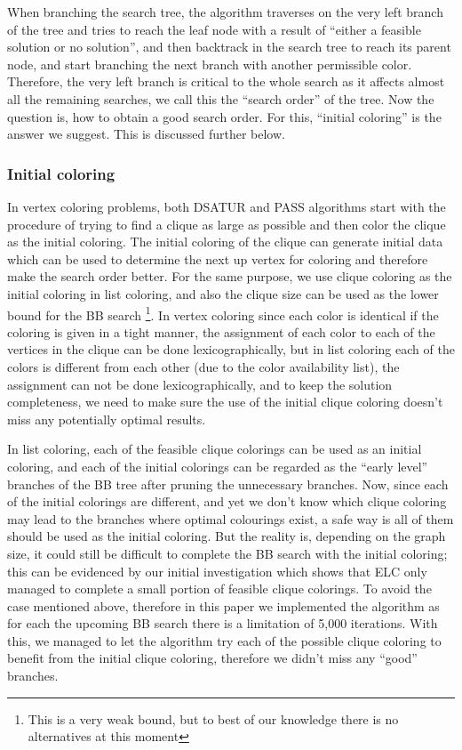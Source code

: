 \documentclass[10pt]{article}
\begin{document}
When branching the search tree, the algorithm traverses on the very left branch of 
the tree and tries to reach the leaf node with a result of ``either a feasible solution or
no solution'', and then backtrack in the search tree to reach its parent node,
and start branching the next branch with another permissible color. Therefore, the very left
branch is critical to the whole search as it affects almost all the remaining searches, we call this the ``search order'' of the tree. Now the question is, how to obtain a good search order. For this, ``initial coloring'' is the answer we suggest. This is discussed further below.   

\subsubsection{Initial coloring}

In vertex coloring problems, both DSATUR\cite{Bre79} and PASS algorithms \cite{PASS} start
with the procedure of trying to find a clique as large as possible and then color the clique as the initial
coloring. The initial coloring of the clique can generate initial data which can be used to determine the next 
up vertex for coloring and therefore make the search order better. For the same purpose, we use clique coloring
as the initial coloring in list coloring, and also the clique size can be used as the lower bound for the BB search \footnote{This is a very weak bound, but to best of our knowledge there is no alternatives at this moment}. In vertex coloring since 
each color is identical if the coloring is given in a tight manner, the assignment of each color 
to each of the vertices in the clique can be done lexicographically, but in list coloring
each of the colors is different from each other (due to the color availability list), the assignment can
not be done lexicographically, and to keep the solution completeness, we need to make sure 
the use of the initial clique coloring doesn't miss any potentially optimal results.  

In list coloring, each of the feasible clique colorings can be used as an initial coloring, and 
each of the initial colorings can be regarded as the ``early level'' branches of the BB tree after pruning the
unnecessary branches. Now, since each of the initial colorings are different, and yet we don't know which 
clique coloring may lead to the branches where optimal colourings exist,   a safe way is all of them should be used as the initial coloring. But the reality is, depending on the graph size, it could still be difficult to complete the BB search with the initial coloring; this can be evidenced by our initial investigation which shows that ELC only managed to complete a small portion of feasible clique colorings.  To avoid the case mentioned above, therefore in this
paper we implemented the algorithm as for each the upcoming BB search there is a limitation of 5,000 iterations. With this, we managed to let the algorithm try each of the possible clique coloring to benefit from the initial clique coloring, therefore we didn't miss any ``good'' branches. 
\end{document}
